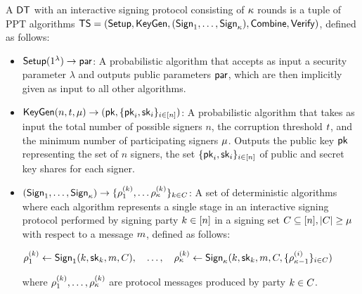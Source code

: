 \begin{definition}
  A  $\mathsf{DT}$ with an interactive signing protocol consisting of $\kappa$ rounds is a tuple of PPT algorithms
$\mathsf{TS} = (\mathsf{Setup}, \mathsf{KeyGen}, \allowbreak (\mathsf{Sign}_1, \ldots, \mathsf{Sign}_\kappa), \allowbreak \mathsf{Combine}, \allowbreak \mathsf{Verify})$, defined as follows:


\begin{itemize}

  \item $\mathsf{Setup}(1^\lambda) \rightarrow \mathsf{par}$:
A probabilistic algorithm that accepts as input a security parameter $\lambda$ and outputs public parameters $\mathsf{par}$,
which are then implicitly given as input to all other algorithms.

  \item $\mathsf{KeyGen}(n,t,\mu) \rightarrow (\mathsf{pk}, \{ \mathsf{pk}_i, \mathsf{sk}_i\}_{i \in [n]})$:
A probabilistic algorithm that takes as input the total number of possible signers $n$,
the corruption threshold $t$,
and the minimum number of participating signers $\mu$.
Outputs the public key $\mathsf{pk}$ representing the set of $n$ signers,
the set $\{ \mathsf{pk}_i, \mathsf{sk}_i \}_{i \in [n]}$ of public and secret key shares for each signer.

  \item $(\mathsf{Sign}_1, \ldots, \mathsf{Sign}_\kappa) \rightarrow \{\rho^{(k)}_1, \ldots \rho^{(k)}_\kappa\}_{k \in C}$:
A set of deterministic algorithms where each algorithm represents a single stage in an interactive signing protocol
performed by signing party $k \in [n]$ in a signing set $C \subseteq [n],
|C| \geq \mu$ with respect to a message $m$, defined as follows:

    \(\rho^{(k)}_1 \gets \mathsf{Sign}_1(k, \mathsf{sk}_k, m, C),
    \quad \ldots, \quad
    \rho^{(k)}_\kappa \gets \mathsf{Sign}_\kappa(k, \mathsf{sk}_k,
    m, C, \{\rho^{(i)}_{\kappa-1}\}_{i \in
    C})\)

where $\rho^{(k)}_1, \ldots, \rho^{(k)}_\kappa$ are protocol messages produced by party $k \in C$.


\end{itemize}
\end{definition}
